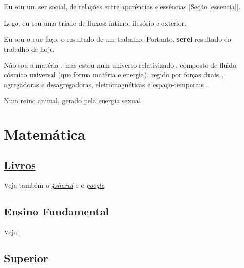 \documentclass[12pt,a4paper]{article}
\begin{document}
		Eu sou um ser social\cite{social}, de rela\c{c}\~oes entre apar\^encias e ess\^encias [Se\c{c}\~ao \ref{essencia}].

		Logo, eu sou uma tr\'iade de fluxos: \'intimo, ilus\'orio \cite{ilusao} e exterior.

		Eu sou o que fa\c{c}o\footnotemark[1], o resultado de um trabalho. Portanto, \textbf{serei} resultado do trabalho de hoje.


		\begin{flushright}
		\end{flushright}

		N\~ao sou a mat\'eria \cite{materia}, mas estou num universo relativizado \cite{relat}, composto de fluido c\'osmico universal (que forma mat\'eria e energia), regido por for\c{c}as duais \cite{dual}, agregadoras e desagregadoras, eletromagn\'eticas e espa\c{c}o-temporais \cite{tempo}.

		Num reino animal, gerado pela energia sexual.

	\section{Matem\'atica}
			\begin{flushright}
			\end{flushright}


		\subsection{\href{http://lib.org.by/_djvu/M_Mathematics/}{Livros}}
			\begin{flushright}
			\end{flushright}

			Veja tamb\'em o \href{http://www.4shared.com/dir/16354738/cea382c8/sharing.html}{\emph{4shared}} e o \href{http://sites.google.com/site/mathspirituality/}{\emph{google}}.

		\subsection{Ensino Fundamental}
			\begin{flushright}
			\end{flushright}

			Veja \cite{planetas}.

		\subsection{Superior}
			\begin{flushright}
			\end{flushright}
\end{document}
